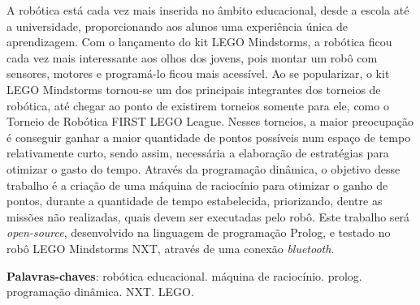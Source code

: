 \begin{resumo}
 A robótica está cada vez mais inserida no âmbito educacional, desde a escola até a universidade, proporcionando aos alunos uma experiência única de aprendizagem. Com o lançamento do kit LEGO Mindstorms, a robótica ficou cada vez mais interessante aos olhos dos jovens, pois montar um robô com sensores, motores e programá-lo ficou mais acessível. Ao se popularizar, o kit LEGO Mindstorms tornou-se um dos principais integrantes dos torneios de robótica, até chegar ao ponto de existirem torneios somente para ele, como o Torneio de Robótica FIRST LEGO League. Nesses torneios, a maior preocupação é conseguir ganhar a maior quantidade de pontos possíveis num espaço de tempo relativamente curto, sendo assim, necessária a elaboração de estratégias para otimizar o gasto do tempo. Através da programação dinâmica, o objetivo desse trabalho é a criação de uma máquina de raciocínio para otimizar o ganho de pontos, durante a quantidade de tempo estabelecida, priorizando, dentre as missões não realizadas, quais devem ser executadas pelo robô. Este trabalho será \textit{open-source}, desenvolvido na linguagem de programação Prolog, e testado no robô LEGO Mindstorms NXT, através de uma conexão \textit{bluetooth}.

\vspace{\onelineskip}
    
 \noindent
 \textbf{Palavras-chaves}: robótica educacional. máquina de raciocínio. prolog. programação dinâmica. NXT. LEGO. 
\end{resumo}
